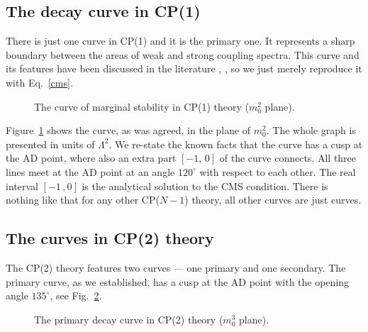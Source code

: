 \documentclass[epsfig,12pt]{article}
\begin{document}
\subsection{The decay curve in CP(1)}

	There is just one curve in CP(1) and it is the primary one.
	It represents a sharp boundary between the areas of weak and strong coupling spectra. 
	This curve and its features have been discussed in the literature \cite{ls1}, \cite{Olmez}, so we
	just merely reproduce it with Eq.~\eqref{cms}.
\begin{figure}
\begin{center}
\epsfxsize=7.5cm
\caption{The curve of marginal stability in CP(1) theory ($ m_0^2 $ plane).}
\label{ccp1}
\end{center}
\end{figure}
	Figure~\ref{ccp1} shows the curve, as was agreed, in the plane of $ m_0^2 $. 
	The whole graph is presented in units of $ \Lambda^2 $.
	We re-state the known facts that the curve has a cusp at the AD point, where also
	an extra part $ [-1,\, 0] $ of the curve connects.
	All three lines meet at the AD point at an angle $ 120^\circ $ with respect to each other.
	The real interval $ [-1\,, 0] $ is the analytical solution to the CMS condition.
	There is nothing like that for any other CP($N-1$) theory, all other curves are
	just curves.
	

\subsection{The curves in CP(2) theory}

	The CP(2) theory features two curves --- one primary and one secondary. 
	The primary curve, as we established, has a cusp at the AD point with the
	opening angle $ 135^\circ $, see Fig.~\ref{pccp2}.
\begin{figure}
\begin{center}
\epsfxsize=7.5cm
\caption{The primary decay curve in CP(2) theory ($ m_0^3 $ plane).} 
\label{pccp2}
\end{center}
\end{figure}
\end{document}
